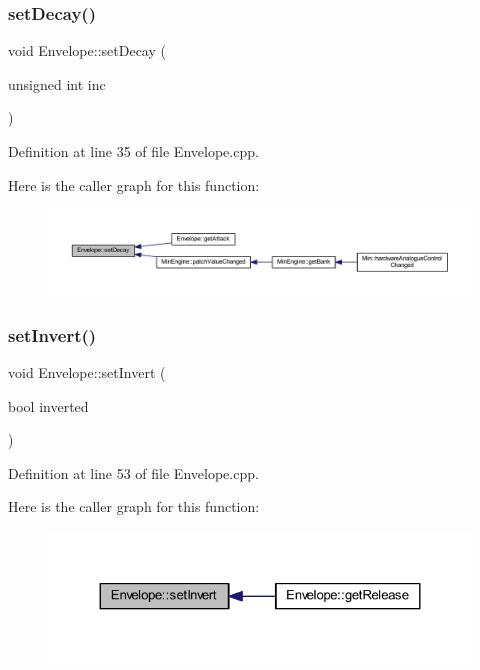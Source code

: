 \subsubsection{\texorpdfstring{set\+Decay()}{setDecay()}}
{\footnotesize\ttfamily void Envelope\+::set\+Decay (\begin{DoxyParamCaption}\item[{unsigned int}]{inc }\end{DoxyParamCaption})}



Definition at line 35 of file Envelope.\+cpp.

Here is the caller graph for this function\+:
\nopagebreak
\begin{figure}[H]
\begin{center}
\leavevmode
\includegraphics[width=350pt]{class_envelope_a5ce19b4d570637216cfd8b0c31447d84_icgraph}
\end{center}
\end{figure}
\mbox{\label{class_envelope_a53797bfa27b46f417ec36f204b9cfecf}} 
\subsubsection{\texorpdfstring{set\+Invert()}{setInvert()}}
{\footnotesize\ttfamily void Envelope\+::set\+Invert (\begin{DoxyParamCaption}\item[{bool}]{inverted }\end{DoxyParamCaption})}



Definition at line 53 of file Envelope.\+cpp.

Here is the caller graph for this function\+:
\nopagebreak
\begin{figure}[H]
\begin{center}
\leavevmode
\includegraphics[width=324pt]{class_envelope_a53797bfa27b46f417ec36f204b9cfecf_icgraph}
\end{center}
\end{figure}
\mbox{\label{class_envelope_a7102e88984b79766c6e9dc4a3c7e278d}} 

